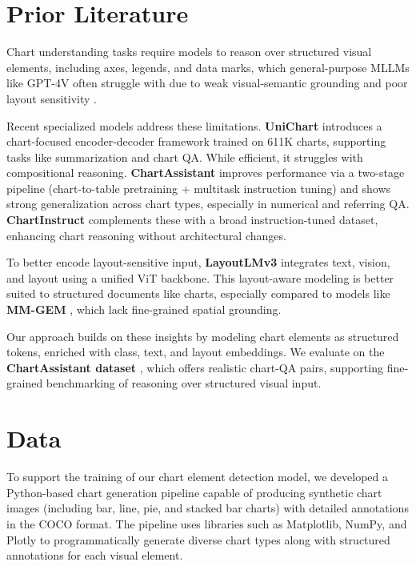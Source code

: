 \documentclass[11pt]{article}
\begin{document}
\section{Prior Literature}

Chart understanding tasks require models to reason over structured visual elements, including axes, legends, and data marks, which general-purpose MLLMs like GPT-4V often struggle with due to weak visual-semantic grounding and poor layout sensitivity \cite{li2024visualizationliteracy, huang2024survey}.

Recent specialized models address these limitations. \textbf{UniChart} \cite{masry2023unichart} introduces a chart-focused encoder-decoder framework trained on 611K charts, supporting tasks like summarization and chart QA. While efficient, it struggles with compositional reasoning. \textbf{ChartAssistant} \cite{zhang2024chartassistant} improves performance via a two-stage pipeline (chart-to-table pretraining + multitask instruction tuning) and shows strong generalization across chart types, especially in numerical and referring QA. \textbf{ChartInstruct} \cite{lin2024chartinstruct} complements these with a broad instruction-tuned dataset, enhancing chart reasoning without architectural changes.

To better encode layout-sensitive input, \textbf{LayoutLMv3} \cite{huang2023layoutlmv3} integrates text, vision, and layout using a unified ViT backbone. This layout-aware modeling is better suited to structured documents like charts, especially compared to models like \textbf{MM-GEM} \cite{zhang2024mmgem}, which lack fine-grained spatial grounding.

Our approach builds on these insights by modeling chart elements as structured tokens, enriched with class, text, and layout embeddings. We evaluate on the \textbf{ChartAssistant dataset} \cite{chartassistant_dataset}, which offers realistic chart-QA pairs, supporting fine-grained benchmarking of reasoning over structured visual input.



\section{Data}
To support the training of our chart element detection model, we developed a Python-based chart generation pipeline capable of producing synthetic chart images (including bar, line, pie, and stacked bar charts) with detailed annotations in the COCO format. The pipeline uses libraries such as Matplotlib, NumPy, and Plotly to programmatically generate diverse chart types along with structured annotations for each visual element.
\end{document}
